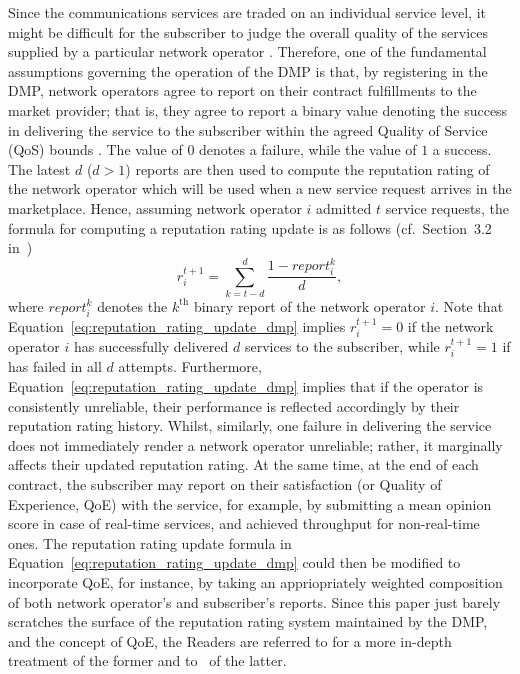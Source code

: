 Since the communications services are traded on an individual service level, it might be difficult for the subscriber to judge the overall quality of the services supplied by a particular network operator \cite{DMIrvine02}. Therefore, one of the fundamental assumptions governing the operation of the DMP is that, by registering in the DMP, network operators agree to report on their contract fulfillments to the market provider; that is, they agree to report a binary value denoting the success in delivering the service to the subscriber within the agreed Quality of Service (QoS) bounds \cite{DMLeBodic00}. The value of $0$ denotes a failure, while the value of $1$ a success. The latest $d$ ($d>1$) reports are then used to compute the reputation rating of the network operator which will be used when a new service request arrives in the marketplace. Hence, assuming network operator $i$ admitted $t$ service requests, the formula for computing a reputation rating update is as follows (cf.~Section~3.2 in~\cite{DMLeBodic00})
\begin{equation}
    \label{eq:reputation_rating_update_dmp}
    r_i^{t+1} = \sum_{k = t-d}^d \frac{1 - report_i^k}{d},
\end{equation}
where $report_i^k$ denotes the $k^{\text{th}}$ binary report of the network operator $i$. Note that Equation~\eqref{eq:reputation_rating_update_dmp} implies $r_i^{t+1} = 0$ if the network operator $i$ has successfully delivered $d$ services to the subscriber, while $r_i^{t+1} = 1$ if has failed in all $d$ attempts. Furthermore, Equation~\eqref{eq:reputation_rating_update_dmp} implies that if the operator is consistently unreliable, their performance is reflected accordingly by their reputation rating history. Whilst, similarly, one failure in delivering the service does not immediately render a network operator unreliable; rather, it marginally affects their updated reputation rating. At the same time, at the end of each contract, the subscriber may report on their satisfaction (or Quality of Experience, QoE) with the service, for example, by submitting a mean opinion score in case of real-time services, and achieved throughput for non-real-time ones. The reputation rating update formula in Equation~\eqref{eq:reputation_rating_update_dmp} could then be modified to incorporate QoE, for instance, by taking an appriopriately weighted composition of both network operator's and subscriber's reports. Since this paper just barely scratches the surface of the reputation rating system maintained by the DMP, and the concept of QoE, the Readers are referred to \cite{DMLeBodic00, LeBodicThesis, DMIrvine02, DMMathur02, DMIrvine01, DMMcDiarmid06} for a more in-depth treatment of the former and to~\cite{Kilkki2008, BrooksHestnes2010, Fiedler2010, Shaikh2010} of the latter.

